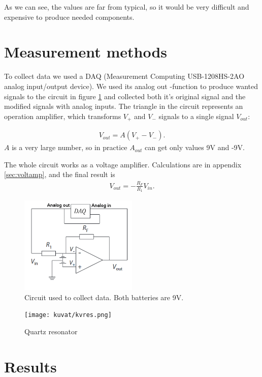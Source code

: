 \documentclass[12pt]{article}
\begin{document}
As we can see, the values are far from typical, so it would be very difficult and expensive to produce needed components.

\section{Measurement methods}
To collect data we used a DAQ (Measurement Computing USB-1208HS-2AO analog input/output device). We used its analog out -function to produce wanted signals to the circuit in figure \ref{fig:circuit} and collected both it's original signal and the modified signals with analog inputs. The triangle in the circuit represents an operation amplifier, which transforms $V_+$ and $V_-$ signals to a single signal $V_{out}$:

\begin{align}
	V_{out} = A(V_+-V_-).
\end{align}
$A$ is a very large number, so in practice $A_{out}$ can get only values 9V and -9V.

The whole circuit works as a voltage amplifier. Calculations are in appendix \ref{sec:voltamp}, and the final result is
\begin{align}
V_{out} = -\frac{R_F}{R_1}V_{in}.
\end{align}

\begin{figure}
	\centering
	\includegraphics[width = 0.5\textwidth]{kuvat/piiri}
	\caption{Circuit used to collect data. Both batteries are 9V.}
	\label{fig:circuit}
\end{figure}

\begin{figure}
	\centering
	\texttt{[image: kuvat/kvres.png]}
	\caption{Quartz resonator}
	\label{fig:kvres}
\end{figure}

\section{Results}
\end{document}
